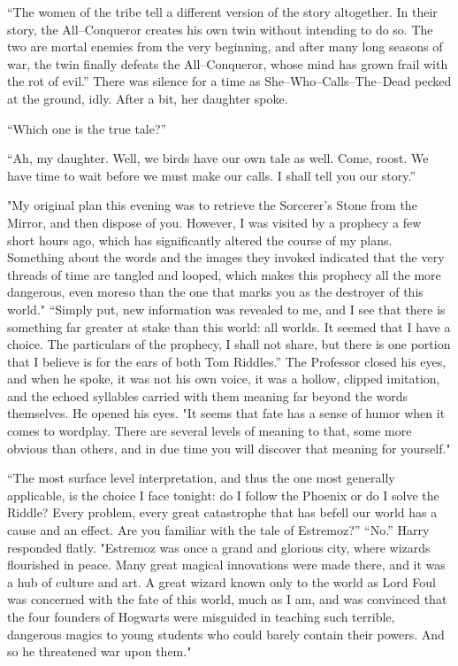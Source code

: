 “The women of the tribe tell a different version of the story altogether. In their story, the All\mbox{--}Conqueror creates his own twin without intending to do so. The two are mortal enemies from the very beginning, and after many long seasons of war, the twin finally defeats the All\mbox{--}Conqueror, whose mind has grown frail with the rot of evil.”
\SmallVSpace
There was silence for a time as She\mbox{--}Who\mbox{--}Calls\mbox{--}The\mbox{--}Dead pecked at the ground, idly. After a bit, her daughter spoke.

“Which one is the true tale?”

“Ah, my daughter. Well, we birds have our own tale as well. Come, roost. We have time to wait before we must make our calls. I shall tell you our story.”
\simpleline
{}

"My original plan this evening was to retrieve the Sorcerer’s Stone from the Mirror, and then dispose of you. However, I was visited by a prophecy a few short hours ago, which has significantly altered the course of my plans. Something about the words and the images they invoked indicated that the very threads of time are tangled and looped, which makes this prophecy all the more dangerous, even moreso than the one that marks you as the destroyer of this world."
\SmallVSpace
“Simply put, new information was revealed to me, and I see that there is something far greater at stake than this world: all worlds. It seemed that I have a choice. The particulars of the prophecy, I shall not share, but there is one portion that I believe is for the ears of both Tom Riddles.”
\SmallVSpace
The Professor closed his eyes, and when he spoke, it was not his own voice, it was a hollow, clipped imitation, and the echoed syllables carried with them meaning far beyond the words themselves.
\SmallVSpace
{}
\SomeVSpace
He opened his eyes. "It seems that fate has a sense of humor when it comes to wordplay. There are several levels of meaning to that, some more obvious than others, and in due time you will discover that meaning for yourself."

“The most surface level interpretation, and thus the one most generally applicable, is the choice I face tonight: do I follow the Phoenix or do I solve the Riddle? Every problem, every great catastrophe that has befell our world has a cause and an effect. Are you familiar with the tale of Estremoz?”
\SmallVSpace
“No.” Harry responded flatly.
\SmallVSpace
"Estremoz was once a grand and glorious city, where wizards flourished in peace. Many great magical innovations were made there, and it was a hub of culture and art. A great wizard known only to the world as Lord Foul was concerned with the fate of this world, much as I am, and was convinced that the four founders of Hogwarts were misguided in teaching such terrible, dangerous magics to young students who could barely contain their powers. And so he threatened war upon them."


